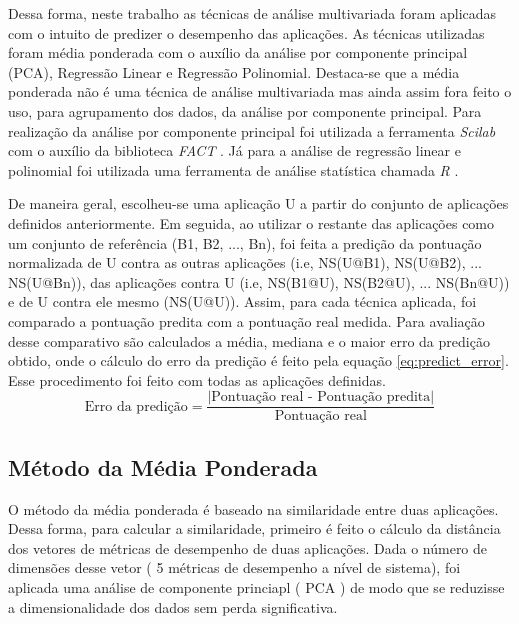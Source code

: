 Dessa forma, neste trabalho as técnicas de análise multivariada foram aplicadas com o intuito de predizer o desempenho das aplicações. As técnicas utilizadas foram média ponderada com o auxílio da análise por componente principal (PCA), Regressão Linear e Regressão Polinomial. Destaca-se que a média ponderada não é uma técnica de análise multivariada mas ainda assim fora feito o uso, para agrupamento dos dados, da análise por componente principal. Para realização da análise por componente principal foi utilizada a ferramenta \textit{Scilab} \footnotemark[15] com o auxílio da biblioteca \textit{FACT} \footnotemark[16]. Já para a análise de regressão linear e polinomial foi utilizada uma ferramenta de análise statística chamada \textit{R} \footnotemark[17].



De maneira geral, escolheu-se uma aplicação U a partir do conjunto de aplicações definidos anteriormente. Em seguida, ao utilizar o restante das aplicações como um conjunto de referência (B1, B2, ..., Bn), foi feita a predição da pontuação normalizada de U contra as outras aplicações (i.e, NS(U@B1), NS(U@B2), ... NS(U@Bn)), das aplicações contra U (i.e, NS(B1@U),
NS(B2@U), ... NS(Bn@U)) e de U contra ele mesmo (NS(U@U)). Assim, para cada técnica aplicada, foi comparado a pontuação predita com a pontuação real medida. Para avaliação desse comparativo são calculados a média, mediana e o maior erro da predição obtido, onde o cálculo do erro da predição é feito pela equação \ref{eq:predict_error}. Esse procedimento foi feito com todas as aplicações definidas.  
\begin{equation}
\label{eq:predict_error}
\textrm{Erro da predição} = \frac{|\textrm{Pontuação real - Pontuação predita}|}{\textrm{Pontuação real}}
\end{equation}
\subsection{Método da Média Ponderada}
O método da média ponderada é baseado na similaridade entre duas aplicações. Dessa forma, para calcular a similaridade, primeiro é feito o cálculo da distância dos vetores de métricas de desempenho de duas aplicações. Dada o número de dimensões desse vetor ( 5 métricas de desempenho a nível de sistema), foi aplicada uma análise de componente princiapl ( PCA ) de modo que se reduzisse a dimensionalidade dos dados sem perda significativa.

